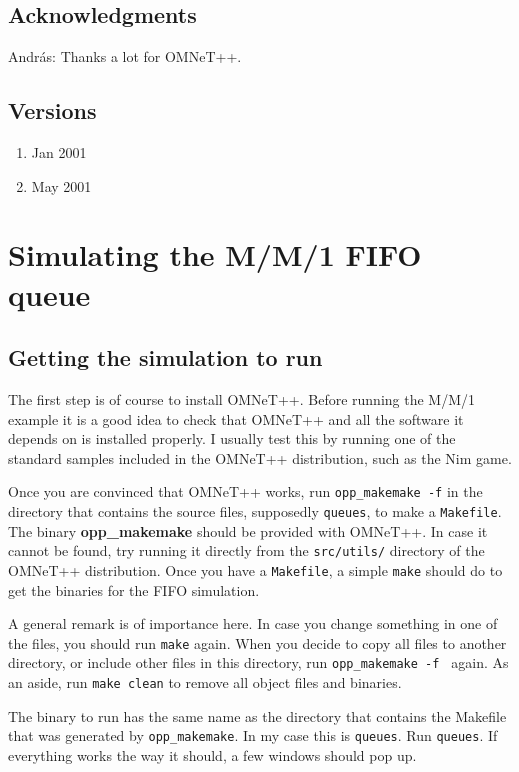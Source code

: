 \documentclass[a4paper]{article}
\begin{document}
\subsection{Acknowledgments}
\label{sec:acknowledgements}
Andr{\'a}s: Thanks a lot for OMNeT++.


\subsection{Versions}
\begin{enumerate}
\item Jan 2001
\item May 2001
\end{enumerate}

\section{Simulating the M/M/1 FIFO queue}
\label{sec:simulating-mm1-fifo}

\subsection{Getting the simulation to run}
\label{sec:getting-it-running}
The first step is of course to install OMNeT++. Before running the
M/M/1 example it is a good idea to check that OMNeT++ and all the
software it depends on is installed properly. I usually test this by
running one of the standard samples included in the OMNeT++
distribution, such as the Nim game.

Once you are convinced that OMNeT++ works, run \texttt{opp\_makemake
  -f} in the directory that contains the source files, supposedly
\texttt{queues},  to make a
\texttt{Makefile}. The binary \textbf{opp\_makemake} should be
provided with OMNeT++.  In case it cannot be found, try running it
directly from the \texttt{src/utils/} directory of the OMNeT++
distribution. Once you have a \texttt{Makefile}, a simple
\texttt{make} should do to get the binaries for the FIFO simulation.

A general remark is of importance here. In case you change something in one
of the files, you should run \texttt{make} again. When you decide to
copy all files to another directory, or include other files in this
directory, run \texttt{opp\_makemake -f } again. As an aside, run
\texttt{make clean} to remove all object files and binaries.

The binary to run has the same name as the directory that contains 
the Makefile that was generated by \texttt{opp\_makemake}. In my case this
is \texttt{queues}. Run \texttt{queues}. If
everything works the way it should, a few windows should pop up.
\end{document}
